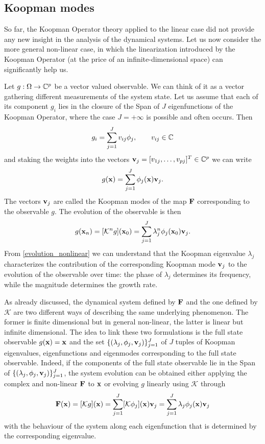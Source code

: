 \subsection{Koopman modes}
So far, the Koopman Operator theory applied to the linear case did not provide any new insight in the analysis of the dynamical systems. Let us now consider the more general non-linear case, in which the linearization introduced by the Koopman Operator (at the price of an infinite-dimensional space) can significantly help us.

Let $g:\Omega\to\mathbb{C}^p$ be a vector valued observable. We can think of it as a vector gathering different measurements of the system state. Let us assume that each of its component $g_i$ lies in the closure of the Span of $J$ eigenfunctions of the Koopman Operator, where the case $J=+\infty$ is possible and often occurs. Then 
\begin{equation*}
	g_i = \sum_{j = 1}^J v_{ij}\phi_j, \qquad v_{ij}\in\mathbb{C}
\end{equation*}
and staking the weights into the vectors $\vb{v}_j = [v_{1j},\dots,v_{pj}]^T\in\mathbb{C}^p$ we can write
\begin{equation}
    \label{koopman_modes}
	g(\vb{x}) = \sum_{j = 1}^J \phi_j(\vb{x})\vb{v}_{j}.
\end{equation}
The vectors $\vb{v}_j$ are called the Koopman modes of the map $\vb{F}$ corresponding to the observable $g$. The evolution of the observable is then
\begin{equation}
	\label{evolution_nonlinear}
	g(\vb{x}_n) = [\mathcal{K}^ng](\vb{x}_0) = \sum_{j = 1}^J \lambda_j^n\phi_j(\vb{x}_0)\vb{v}_{j}.
\end{equation}
From \eqref{evolution_nonlinear} we can understand that the Koopman eigenvalue $\lambda_j$ characterizes the contribution of the corresponding Koopman mode $\vb{v}_j$ to the evolution of the observable over time: the phase of $\lambda_j$ determines its frequency, while the magnitude determines the growth rate.

As already discussed, the dynamical system defined by $\vb{F}$ and the one defined by $\mathcal{K}$ are two different ways of describing the same underlying phenomenon. The former is finite dimensional but in general non-linear, the latter is linear but infinite dimensional. The idea to link these two formulations is the full state observable $g(\vb{x}) = \vb{x}$ and the set $\{(\lambda_j, \phi_j, \vb{v}_j)\}_{j = 1}^J$ of $J$ tuples of Koopman eigenvalues, eigenfunctions and eigenmodes corresponding to the full state observable. Indeed, if the components of the full state observable lie in the Span of $\{(\lambda_j, \phi_j, \vb{v}_j)\}_{j = 1}^J$, the system evolution can be obtained either applying the complex and non-linear $\vb{F}$ to $\vb{x}$ or evolving $g$ linearly using $\mathcal{K}$ through
\begin{equation*}
	\vb{F}(\vb{x}) = [\mathcal{K}g](\vb{x}) = \sum_{j = 1}^J [\mathcal{K}\phi_j](\vb{x})\vb{v}_j = \sum_{j = 1}^J \lambda_j\phi_j(\vb{x})\vb{v}_j
\end{equation*}
with the behaviour of the system along each eigenfunction that is determined by the corresponding eigenvalue.